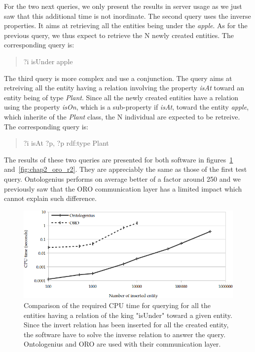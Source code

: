 For the two next queries, we only present the results in server usage as we just saw that this additional time is not inordinate. The second query uses the inverse properties. It aims at retrieving all the entities being under the \textit{apple}. As for the previous query, we thus expect to retrieve the N newly created entities. The corresponding \sparql query is:

\begin{quote} 
\centering 
?i isUnder apple
\end{quote}

The third query is more complex and use a conjunction. The query aims at retreiving all the entity having a relation involving the property \textit{isAt} toward an entity being of type \textit{Plant}. Since all the newly created entities have a relation using the property \textit{isOn}, which is a sub-property if \textit{isAt}, toward the entity \textit{apple}, which inherite of the \textit{Plant} class, the N individual are expected to be retreive. The corresponding \sparql{} query is:

\begin{quote} 
\centering 
?i isAt ?p, ?p rdf:type Plant
\end{quote}

The results of these two queries are presented for both software in figures~\ref{fig:chap2_oro_r3} and~\ref{fig:chap2_oro_r2}. They are appreciably the same as those of the first test query. Ontologenius performs on average better of a factor around 250 and we previously saw that the ORO communication layer has a limited impact which cannot explain such difference.

\begin{figure}[ht!]
\centering
\includegraphics[width=\textwidth]{figures/chapter2/oro/R3.png}
\caption{\label{fig:chap2_oro_r3} Comparison of the required CPU time for querying for all the entities having a relation of the king "isUnder" toward a given entity. Since the invert relation has been inserted for all the created entity, the software have to solve the inverse relation to answer the query. Ontologenius and ORO are used with their communication layer.}
\end{figure}

